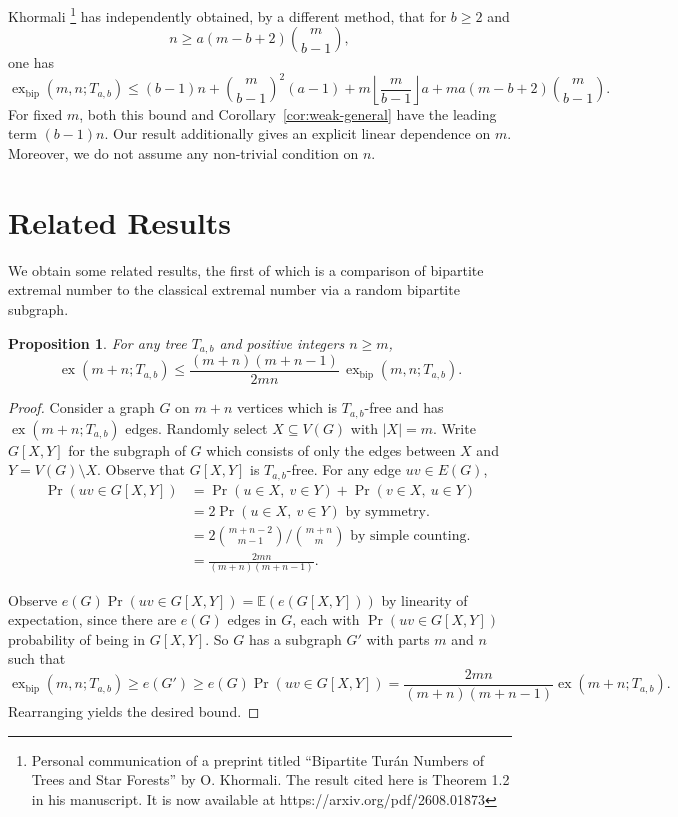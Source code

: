 \documentclass[12pt]{article}
\newtheorem{proposition}[theorem]{Proposition}
\theoremstyle{definition}
\theoremstyle{remark}
\newcommand{\ex}{\operatorname{ex}}
\newcommand{\exbip}{\operatorname{ex}_{\mathrm{bip}}}
\begin{document}
\noindent Khormali \footnote{Personal communication of a preprint titled ``Bipartite Tur\'an Numbers of Trees and Star Forests'' by O. Khormali. The result cited here is Theorem 1.2 in his manuscript. It is now available at https://arxiv.org/pdf/2608.01873} has independently obtained, by a different method, that for
$b\geq 2$ and
\[
    n\geq a(m-b+2)\binom{m}{b-1},
\]
one has
\[
    \exbip(m,n;T_{a,b})\leq(b-1)n+\binom{m}{b-1}^2(a-1)+m\left\lfloor\frac{m}{b-1}\right\rfloor a+ma(m-b+2)\binom{m}{b-1}.
\]
For fixed $m$, both this bound and Corollary~\ref{cor:weak-general}
have the leading term $(b-1)n$. Our result additionally gives an explicit linear dependence on $m$. Moreover, we do not assume any non-trivial condition on $n$.






\section{Related Results}
\label{sec:related}

We obtain some related results, the first of which is a comparison of bipartite extremal number to the classical extremal number via a random bipartite subgraph.

\begin{proposition}
\label{prop:random-bipartition}
    For any tree $T_{a,b}$ and positive integers $n\geq m$, 
    \[
    \ex(m+n;T_{a,b})\leq \frac{(m+n)(m+n-1)}{2mn}\,\exbip(m,n;T_{a,b}).
    \]
\end{proposition}

\begin{proof}
    Consider a graph $G$ on $m+n$ vertices which is $T_{a,b}$-free and has $\ex(m+n;T_{a,b})$ edges. Randomly select $X\subseteq V(G)$ with $|X|=m$. Write $G[X,Y]$ for the subgraph of $G$ which consists of only the edges between $X$ and $Y=V(G)\setminus X$. Observe that $G[X,Y]$ is $T_{a,b}$-free. For any edge $uv\in E(G)$, \begin{align*}
        \Pr(uv\in G[X,Y])&=\Pr(u\in X,\ v\in Y)+\Pr(v\in X,\ u\in Y)\\
        &=2\Pr(u\in X,\ v\in Y)\text{ by symmetry.}\\
        &=2\binom{m+n-2}{m-1}/\binom{m+n}{m}\text{ by simple counting.}\\
        &=\frac{2mn}{(m+n)(m+n-1)}.
    \end{align*}
    
     Observe $e(G)\Pr(uv\in G[X,Y])=\mathbb{E}(e(G[X,Y]))$ by linearity of expectation, since there are $e(G)$ edges in $G$, each with $\Pr(uv\in G[X,Y])$ probability of being in $G[X,Y]$. So $G$ has a subgraph $G'$ with parts $m$ and $n$ such that 
     \[
     \exbip(m,n;T_{a,b})\geq e(G')\geq e(G)\Pr(uv\in G[X,Y])=\frac{2mn}{(m+n)(m+n-1)}\ex(m+n;T_{a,b}).
     \]
     Rearranging yields the desired bound.
\end{proof}
\end{document}
